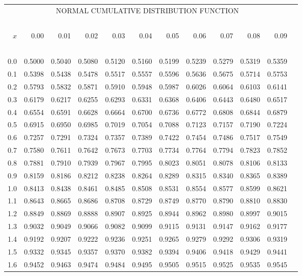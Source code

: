 \documentclass{article}
\begin{document}
\thispagestyle{empty}
\begin{center}
\begin{tabular}{rr@{\ }r@{\ }r@{\ }r@{\ }r@{\ }r@{\ }r@{\ }r@{\ }r@{\ }r@{\ }r}
\multicolumn{11}{c}{NORMAL CUMULATIVE DISTRIBUTION FUNCTION}\\
\ \\
$x$ & 0.00 & 0.01 & 0.02 & 0.03 & 0.04 & 0.05 & 0.06 & 0.07 & 0.08 & 0.09\\
\ \\
0.0 &0.5000 &0.5040 &0.5080 &0.5120 &0.5160 &0.5199 &0.5239 &0.5279 &0.5319 &0.5359\\
0.1 &0.5398 &0.5438 &0.5478 &0.5517 &0.5557 &0.5596 &0.5636 &0.5675 &0.5714 &0.5753\\
0.2 &0.5793 &0.5832 &0.5871 &0.5910 &0.5948 &0.5987 &0.6026 &0.6064 &0.6103 &0.6141\\
0.3 &0.6179 &0.6217 &0.6255 &0.6293 &0.6331 &0.6368 &0.6406 &0.6443 &0.6480 &0.6517\\
0.4 &0.6554 &0.6591 &0.6628 &0.6664 &0.6700 &0.6736 &0.6772 &0.6808 &0.6844 &0.6879\\
0.5 &0.6915 &0.6950 &0.6985 &0.7019 &0.7054 &0.7088 &0.7123 &0.7157 &0.7190 &0.7224\\
0.6 &0.7257 &0.7291 &0.7324 &0.7357 &0.7389 &0.7422 &0.7454 &0.7486 &0.7517 &0.7549\\
0.7 &0.7580 &0.7611 &0.7642 &0.7673 &0.7703 &0.7734 &0.7764 &0.7794 &0.7823 &0.7852\\
0.8 &0.7881 &0.7910 &0.7939 &0.7967 &0.7995 &0.8023 &0.8051 &0.8078 &0.8106 &0.8133\\
0.9 &0.8159 &0.8186 &0.8212 &0.8238 &0.8264 &0.8289 &0.8315 &0.8340 &0.8365 &0.8389\\
1.0 &0.8413 &0.8438 &0.8461 &0.8485 &0.8508 &0.8531 &0.8554 &0.8577 &0.8599 &0.8621\\
1.1 &0.8643 &0.8665 &0.8686 &0.8708 &0.8729 &0.8749 &0.8770 &0.8790 &0.8810 &0.8830\\
1.2 &0.8849 &0.8869 &0.8888 &0.8907 &0.8925 &0.8944 &0.8962 &0.8980 &0.8997 &0.9015\\
1.3 &0.9032 &0.9049 &0.9066 &0.9082 &0.9099 &0.9115 &0.9131 &0.9147 &0.9162 &0.9177\\
1.4 &0.9192 &0.9207 &0.9222 &0.9236 &0.9251 &0.9265 &0.9279 &0.9292 &0.9306 &0.9319\\
1.5 &0.9332 &0.9345 &0.9357 &0.9370 &0.9382 &0.9394 &0.9406 &0.9418 &0.9429 &0.9441\\
1.6 &0.9452 &0.9463 &0.9474 &0.9484 &0.9495 &0.9505 &0.9515 &0.9525 &0.9535 &0.9545\\

\end{tabular}
\end{center}
\end{document}
